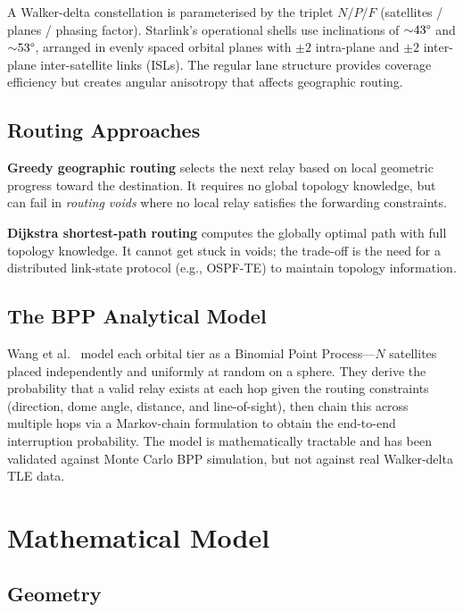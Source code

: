 \documentclass[12pt,a4paper]{report}
\begin{document}
A Walker-delta constellation is parameterised by the triplet $N/P/F$ (satellites /
planes / phasing factor). Starlink's operational shells use inclinations of
${\sim}43\text{\textdegree}$ and ${\sim}53\text{\textdegree}$, arranged in evenly
spaced orbital planes with $\pm 2$ intra-plane and $\pm 2$ inter-plane
inter-satellite links (ISLs). The regular lane structure provides coverage efficiency
but creates angular anisotropy that affects geographic routing.

\section{Routing Approaches}

\textbf{Greedy geographic routing} selects the next relay based on local geometric
progress toward the destination. It requires no global topology knowledge, but can fail
in \emph{routing voids} where no local relay satisfies the forwarding constraints.

\textbf{Dijkstra shortest-path routing} computes the globally optimal path with full
topology knowledge. It cannot get stuck in voids; the trade-off is the need for a
distributed link-state protocol (e.g., OSPF-TE) to maintain topology information.

\section{The BPP Analytical Model}

Wang et al.\ \cite{wang2023reliability} model each orbital tier as a Binomial Point
Process---$N$ satellites placed independently and uniformly at random on a sphere. They
derive the probability that a valid relay exists at each hop given the routing
constraints (direction, dome angle, distance, and line-of-sight), then chain this across
multiple hops via a Markov-chain formulation to obtain the end-to-end interruption
probability. The model is mathematically tractable and has been validated against
Monte Carlo BPP simulation, but not against real Walker-delta TLE data.

\chapter{Mathematical Model}
\label{ch:math}

\section{Geometry}
\end{document}
